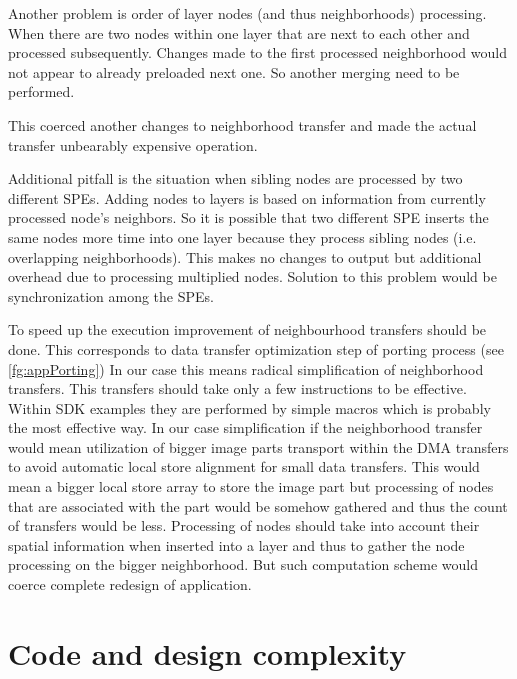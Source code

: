 \par
\label{neighbourhoodDependecy}
Another problem is order of layer nodes (and thus neighborhoods) processing.
When there are two nodes within one layer that are next to each other and processed subsequently.
Changes made to the first processed neighborhood would not appear to already preloaded next one.
So another merging need to be performed.

\par
This coerced another changes to neighborhood transfer and made the actual transfer unbearably expensive operation.

\par
\label{workDependecy}
Additional pitfall is the situation when sibling nodes are processed by two different SPEs.
Adding nodes to layers is based on information from currently processed node's neighbors.
So it is possible that two different SPE inserts the same nodes more time into one layer because they process sibling nodes (i.e. overlapping neighborhoods).
This makes no changes to output but additional overhead due to processing multiplied nodes.
Solution to this problem would be synchronization among the SPEs.

\par
To speed up the execution improvement of neighbourhood transfers should be done.
This corresponds to data transfer optimization step of porting process (see \ref{fg:appPorting})
In our case this means radical simplification of neighborhood transfers.
This transfers should take only a few instructions to be effective.
Within SDK examples they are performed by simple macros which is probably the most effective way.
In our case simplification if the neighborhood transfer would mean utilization of bigger image parts transport within the DMA transfers to avoid automatic local store alignment for small data transfers.
This would mean a bigger local store array to store the image part but processing of nodes that are associated with the part would be somehow gathered and thus the count of transfers would be less.
Processing of nodes should take into account their spatial information when inserted into a layer and thus to gather the node processing on the bigger neighborhood.
But such computation scheme would coerce complete redesign of application.

\section{Code and design complexity}

